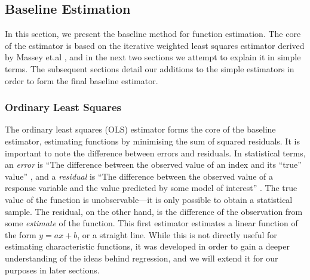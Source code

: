 \documentclass[a4paper,11pt]{article}
\begin{document}
\subsection{Baseline Estimation}
\label{sec-4-1}

   In this section, we present the baseline method for function estimation. The
   core of the estimator is based on the iterative weighted least squares
   estimator derived by Massey et.al \cite{massey1996estimating}, and in the
   next two sections we attempt to explain it in simple terms. The subsequent
   sections detail our additions to the simple estimators in order to form the
   final baseline estimator.
\subsubsection{Ordinary Least Squares}
\label{sec-4-1-1}

    The ordinary least squares (OLS) estimator forms the core of the baseline
    estimator, estimating functions by minimising the sum of squared
    residuals. It is important to note the difference between errors and
    residuals. In statistical terms, an \emph{error} is ``The difference between
    the observed value of an index and its ``true'' value'' \cite{2008oecd}, and
    a \emph{residual} is ``The difference between the observed value of a
    response variable and the value predicted by some model of interest''
    \cite{everitt2010cambridge}. The true value of the function is
    unobservable---it is only possible to obtain a statistical sample. The
    residual, on the other hand, is the difference of the observation from some
    \emph{estimate} of the function. This first estimator estimates a linear
    function of the form $y=ax+b$, or a straight line. While this is not
    directly useful for estimating characteristic functions, it was developed in
    order to gain a deeper understanding of the ideas behind regression, and we
    will extend it for our purposes in later sections.
\end{document}
